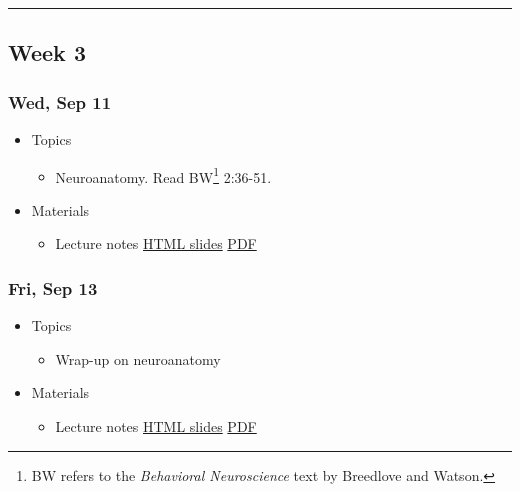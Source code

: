 \documentclass[]{article}
\providecommand{\tightlist}{%
  \setlength{\itemsep}{0pt}\setlength{\parskip}{0pt}}
\let\rmarkdownfootnote\footnote%
\def\footnote{\protect\rmarkdownfootnote}
\begin{document}
\begin{center}\rule{0.5\linewidth}{\linethickness}\end{center}

\hypertarget{week-3}{%
\subsection{Week 3}\label{week-3}}

\hypertarget{wed-sep-11}{%
\subsubsection{Wed, Sep 11}\label{wed-sep-11}}

\begin{itemize}
\tightlist
\item
  Topics

  \begin{itemize}
  \tightlist
  \item
    Neuroanatomy. Read BW\footnote{BW refers to the \emph{Behavioral
      Neuroscience} text by Breedlove and Watson.} 2:36-51.
  \end{itemize}
\item
  Materials

  \begin{itemize}
  \tightlist
  \item
    Lecture notes \textbar{} \href{}{HTML slides} \textbar{}
    \href{}{PDF}
  \end{itemize}
\end{itemize}

\hypertarget{fri-sep-13}{%
\subsubsection{Fri, Sep 13}\label{fri-sep-13}}

\begin{itemize}
\tightlist
\item
  Topics

  \begin{itemize}
  \tightlist
  \item
    Wrap-up on neuroanatomy
  \end{itemize}
\item
  Materials

  \begin{itemize}
  \tightlist
  \item
    Lecture notes \textbar{} \href{}{HTML slides} \textbar{}
    \href{}{PDF}
  \end{itemize}
\end{itemize}
\end{document}
